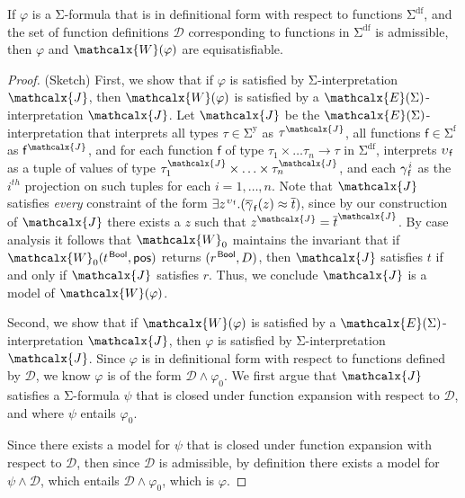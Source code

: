 \documentclass[runningheads,a4paper]{llncs}
\newcommand{\con}[1]{\mathsf{#1}}
\renewcommand\vec[1]{\overline{#1}}
\let\oldSigma=\Sigma
\def\Sigma{\mathrm{\oldSigma}}
\newcommand{\teq}{\approx}
\newcommand{\I}{\mathcalx{J}} %
\newcommand{\J}{\mathcalx{J}}
\newcommand{\conv}{\mathcalx{W}}
\newcommand{\ssorts}[1]{#1^\mathrm{y}}
\newcommand{\sfuns}[1]{#1^\mathrm{f}}
\newcommand{\sfundefs}[1]{#1^\mathrm{df}}
\newcommand{\ptrue}{\con{pos}}
\newcommand{\Bool}{\con{Bool}}
\newcommand\concret{\gamma} %
\newcommand{\vecfarg}[1]{\vec{\concret}_{\vthinspace#1}}
\newcommand{\fargx}[2]{\concret^{\vthinspace#2}_{\vthinspace#1}}
\newcommand{\fargsort}[1]{\upsilon_{\vthinspace#1}}
\newcommand{\extendsig}[1]{\mathcalx{E}( #1 )}
\newcommand{\vthinspace}{\kern+0.083333em}
\newcommand{\typ}[1]{^{\vthinspace #1}}
\begin{document}
\begin{theorem}
If $\varphi$ is a $\Sigma$-formula that is in definitional form with respect to functions $\sfundefs{\Sigma}$,
and the set of function definitions $\mathcal{D}$ corresponding to functions in $\sfundefs{\Sigma}$ is admissible,
then $\varphi$ and $\conv( \varphi )$ are equisatisfiable.
\end{theorem}
\begin{proof}
(Sketch)  First, we show that if $\varphi$ is satisfied by $\Sigma$-interpretation $\I$, then $\conv( \varphi )$ is satisfied by a $\extendsig{\Sigma}$-interpretation $\J$.
Let $\J$ be the $\extendsig{\Sigma}$-interpretation that interprets all types $\tau \in \ssorts{\Sigma}$ as $\tau^\I$,
all functions $\con{f} \in \sfuns{\Sigma}$ as $\con{f}^\I$,
and for each function $\con{f}$ of type $\tau_1 \times \ldots \tau_n \rightarrow \tau$ in $\sfundefs{\Sigma}$, 
interprets $\fargsort{\con{f}}$ as a tuple of values of type $\tau_1^\I \times \ldots \times \tau_n^\I$,
and each $\fargx{\con{f}}{i}$ as the $i^{th}$ projection on such tuples for each $i = 1, \ldots, n$.
Note that $\J$ satisfies \emph{every} constraint of the form $\exists z\typ{\fargsort{\con{f}}}. ( \vecfarg{\con{f}}( z ) \teq \vec t )$,
since by our construction of $\J$ there exists a $z$ such that $z^\J = \vec t^\J$.
By case analysis it follows that $\conv_0$ maintains the invariant that
if $\conv_0( t\typ{\Bool}, \ptrue )$ returns $( r\typ{\Bool}, D )$,
then $\I$ satisfies $t$ if and only if $\J$ satisfies $r$.
Thus, we conclude $\J$ is a model of $\conv( \varphi )$.

Second, we show that if $\conv( \varphi )$ is satisfied by a $\extendsig{\Sigma}$-interpretation $\I$, then $\varphi$ is satisfied by $\Sigma$-interpretation $\J$.
Since $\varphi$ is in definitional form with respect to functions defined by $\mathcal{D}$, we know $\varphi$ is of the form $\mathcal{D} \wedge \varphi_0$.
We first argue that $\I$ satisfies a $\Sigma$-formula $\psi$ that is closed under function expansion with respect to $\mathcal{D}$,
and where $\psi$ entails $\varphi_0$.

Since there exists a model for $\psi$ that is closed under function expansion with respect to $\mathcal{D}$, 
then since $\mathcal{D}$ is admissible,
by definition there exists a model for $\psi \wedge \mathcal{D}$, which entails $\mathcal{D} \wedge \varphi_0$, which is $\varphi$.
\end{proof}
\end{document}
